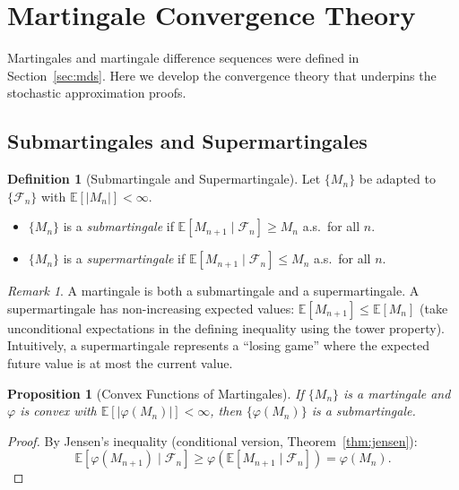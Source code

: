 \documentclass[11pt,a4paper]{article}
\theoremstyle{definition}
\newtheorem{definition}{Definition}[section]
\theoremstyle{plain}
\newtheorem{proposition}[theorem]{Proposition}
\theoremstyle{remark}
\newtheorem{remark}{Remark}[section]
\newcommand{\E}{\mathbb{E}}
\begin{document}
\section{Martingale Convergence Theory}
\label{sec:martingale_convergence}

Martingales and martingale difference sequences were defined in Section~\ref{sec:mds}. Here we develop the convergence theory that underpins the stochastic approximation proofs.

\subsection{Submartingales and Supermartingales}
\label{subsec:sub_super}

\begin{definition}[Submartingale and Supermartingale]
\label{def:sub_super}
Let $\{M_n\}$ be adapted to $\{\mathcal{F}_n\}$ with $\E[|M_n|] < \infty$.
\begin{itemize}[nosep]
    \item $\{M_n\}$ is a \emph{submartingale} if $\E[M_{n+1} \mid \mathcal{F}_n] \geq M_n$ a.s.\ for all $n$.
    \item $\{M_n\}$ is a \emph{supermartingale} if $\E[M_{n+1} \mid \mathcal{F}_n] \leq M_n$ a.s.\ for all $n$.
\end{itemize}
\end{definition}

\begin{remark}
A martingale is both a submartingale and a supermartingale. A supermartingale has non-increasing expected values: $\E[M_{n+1}] \leq \E[M_n]$ (take unconditional expectations in the defining inequality using the tower property). Intuitively, a supermartingale represents a ``losing game'' where the expected future value is at most the current value.
\end{remark}

\begin{proposition}[Convex Functions of Martingales]
\label{prop:convex_martingale}
If $\{M_n\}$ is a martingale and $\varphi$ is convex with $\E[|\varphi(M_n)|] < \infty$, then $\{\varphi(M_n)\}$ is a submartingale.
\end{proposition}

\begin{proof}
By Jensen's inequality (conditional version, Theorem~\ref{thm:jensen}):
\begin{equation}
    \E[\varphi(M_{n+1}) \mid \mathcal{F}_n] \geq \varphi(\E[M_{n+1} \mid \mathcal{F}_n]) = \varphi(M_n).
\end{equation}
\end{proof}
\end{document}
